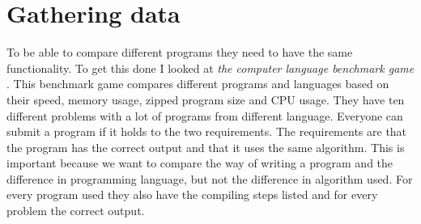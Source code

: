 



\section{Gathering data}
To be able to compare different programs they need to have the same functionality. To get this done I looked at \textit{the computer language benchmark game} \cite{gouy:2019}. This benchmark game compares different programs and languages based on their speed, memory usage, zipped program size and CPU usage. They have ten different problems with a lot of programs from different language. Everyone can submit a program if it holds to the two requirements. The requirements are that the program has the correct output and that it uses the same algorithm. This is important because we want to compare the way of writing a program and the difference in programming language, but not the difference in algorithm used. For every program used they also have the compiling steps listed and for every problem the correct output.\\

